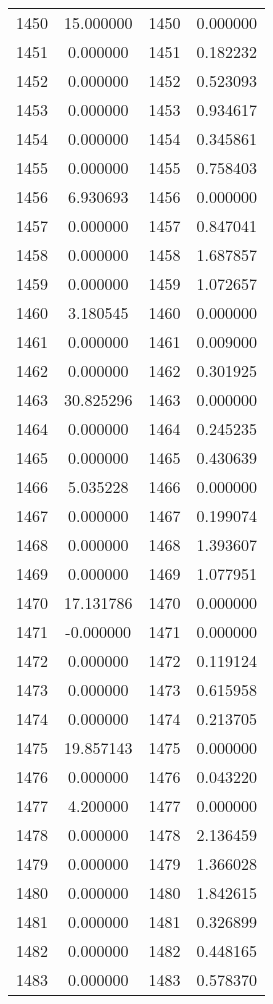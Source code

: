 \documentclass[12pt]{article}
\begin{document}
\begin{longtable}{@{}cccc@{}}
1450 & 15.000000 & 1450 & 0.000000 \\
1451 & 0.000000 & 1451 & 0.182232 \\
1452 & 0.000000 & 1452 & 0.523093 \\
1453 & 0.000000 & 1453 & 0.934617 \\
1454 & 0.000000 & 1454 & 0.345861 \\
1455 & 0.000000 & 1455 & 0.758403 \\
1456 & 6.930693 & 1456 & 0.000000 \\
1457 & 0.000000 & 1457 & 0.847041 \\
1458 & 0.000000 & 1458 & 1.687857 \\
1459 & 0.000000 & 1459 & 1.072657 \\
1460 & 3.180545 & 1460 & 0.000000 \\
1461 & 0.000000 & 1461 & 0.009000 \\
1462 & 0.000000 & 1462 & 0.301925 \\
1463 & 30.825296 & 1463 & 0.000000 \\
1464 & 0.000000 & 1464 & 0.245235 \\
1465 & 0.000000 & 1465 & 0.430639 \\
1466 & 5.035228 & 1466 & 0.000000 \\
1467 & 0.000000 & 1467 & 0.199074 \\
1468 & 0.000000 & 1468 & 1.393607 \\
1469 & 0.000000 & 1469 & 1.077951 \\
1470 & 17.131786 & 1470 & 0.000000 \\
1471 & -0.000000 & 1471 & 0.000000 \\
1472 & 0.000000 & 1472 & 0.119124 \\
1473 & 0.000000 & 1473 & 0.615958 \\
1474 & 0.000000 & 1474 & 0.213705 \\
1475 & 19.857143 & 1475 & 0.000000 \\
1476 & 0.000000 & 1476 & 0.043220 \\
1477 & 4.200000 & 1477 & 0.000000 \\
1478 & 0.000000 & 1478 & 2.136459 \\
1479 & 0.000000 & 1479 & 1.366028 \\
1480 & 0.000000 & 1480 & 1.842615 \\
1481 & 0.000000 & 1481 & 0.326899 \\
1482 & 0.000000 & 1482 & 0.448165 \\
1483 & 0.000000 & 1483 & 0.578370 \\

\end{longtable}
\end{document}
